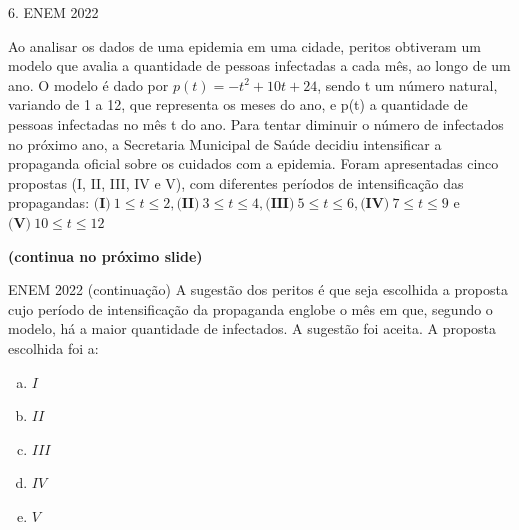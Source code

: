 \documentclass[11pt]{beamer}
\begin{document}
\begin{frame}{6. ENEM 2022}

    Ao analisar os dados de uma epidemia em uma cidade, peritos obtiveram um modelo que avalia a quantidade de pessoas infectadas a cada mês, ao longo de um ano. O modelo é dado por $p(t)=-t^{2}+10t+24$, sendo t um número natural, variando de 1 a 12, que representa os meses do ano, e p(t) a quantidade de pessoas infectadas no mês t do ano. Para tentar diminuir o número de infectados no próximo ano, a Secretaria Municipal de Saúde decidiu intensificar a propaganda oficial sobre os cuidados com a epidemia. Foram apresentadas cinco propostas (I, II, III, IV e V), com diferentes períodos de intensificação das propagandas: $\textbf{(I)}\ 1 \leq t \leq 2, \textbf{(II)}\ 3 \leq t \leq 4, \textbf{(III)}\ 5 \leq t \leq 6, \textbf{(IV)}\ 7 \leq t \leq 9$ e $\textbf{(V)}\ 10 \leq t \leq 12$

    \vfill
    \textbf{(continua no próximo slide)}
\end{frame}
\begin{frame}{ENEM 2022 (continuação)}
    A sugestão dos peritos é que seja escolhida a proposta cujo período de intensificação da propaganda englobe o mês em que, segundo o modelo, há a maior quantidade de infectados. A sugestão foi aceita. A proposta escolhida foi a:

    \begin{enumerate}[a)]
            \item $I$
            \item $II$
            \item $III$ %
            \item $IV$ 
            \item $V$
        \end{enumerate}
\end{frame}
\end{document}
